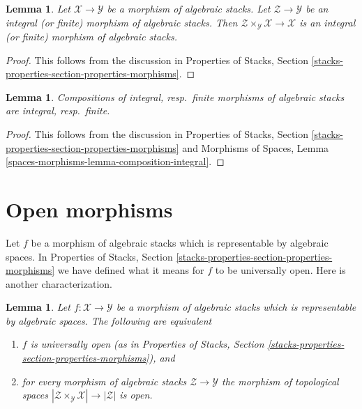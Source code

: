 \documentclass{stacks-project}
\theoremstyle{plain}
\newtheorem{lemma}[subsection]{Lemma}
\theoremstyle{definition}
\theoremstyle{remark}
\numberwithin{equation}{subsection}
\begin{document}
\begin{lemma}
\label{lemma-base-change-integral}
Let $\mathcal{X} \to \mathcal{Y}$ be a morphism of algebraic stacks.
Let $\mathcal{Z} \to \mathcal{Y}$ be an integral (or finite)
morphism of algebraic stacks. Then
$\mathcal{Z} \times_\mathcal{Y} \mathcal{X} \to \mathcal{X}$
is an integral (or finite) morphism of algebraic stacks.
\end{lemma}

\begin{proof}
This follows from the discussion in
Properties of Stacks, Section
\ref{stacks-properties-section-properties-morphisms}.
\end{proof}

\begin{lemma}
\label{lemma-composition-integral}
Compositions of integral, resp.\ finite morphisms of algebraic stacks
are integral, resp.\ finite.
\end{lemma}

\begin{proof}
This follows from the discussion in
Properties of Stacks, Section
\ref{stacks-properties-section-properties-morphisms}
and
Morphisms of Spaces, Lemma \ref{spaces-morphisms-lemma-composition-integral}.
\end{proof}




\section{Open morphisms}
\label{section-open}

\noindent
Let $f$ be a morphism of algebraic stacks which is representable by
algebraic spaces. In
Properties of Stacks, Section
\ref{stacks-properties-section-properties-morphisms}
we have defined what it means for $f$ to be universally open.
Here is another characterization.

\begin{lemma}
\label{lemma-characterize-representable-universally-open}
Let $f : \mathcal{X} \to \mathcal{Y}$ be a morphism of
algebraic stacks which is representable by algebraic spaces.
The following are equivalent
\begin{enumerate}
\item $f$ is universally open (as in Properties of Stacks,
Section \ref{stacks-properties-section-properties-morphisms}), and
\item for every morphism of algebraic stacks $\mathcal{Z} \to \mathcal{Y}$
the morphism of topological spaces
$|\mathcal{Z} \times_\mathcal{Y} \mathcal{X}| \to |\mathcal{Z}|$ is open.
\end{enumerate}
\end{lemma}
\end{document}
